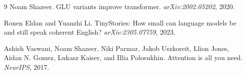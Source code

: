 \documentclass{article}
\begin{document}
\begin{thebibliography}{9}
Noam Shazeer.
\newblock GLU variants improve transformer.
\newblock \emph{arXiv:2002.05202}, 2020.

Ronen Eldan and Yuanzhi Li.
\newblock TinyStories: How small can language models be and still speak coherent English?
\newblock \emph{arXiv:2305.07759}, 2023.

Ashish Vaswani, Noam Shazeer, Niki Parmar, Jakob Uszkoreit, Llion Jones, Aidan N. Gomez, Lukasz Kaiser, and Illia Polosukhin.
\newblock Attention is all you need.
\newblock \emph{NeurIPS}, 2017.

\end{thebibliography}
\end{document}
